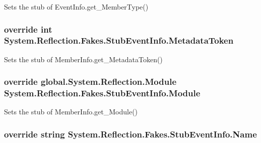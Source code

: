 Sets the stub of Event\-Info.\-get\-\_\-\-Member\-Type()

\hypertarget{class_system_1_1_reflection_1_1_fakes_1_1_stub_event_info_a74ab710ef8a7fcb8a5a868e999e67e84}{
\subsubsection[{Metadata\-Token}]{\setlength{\rightskip}{0pt plus 5cm}override int System.\-Reflection.\-Fakes.\-Stub\-Event\-Info.\-Metadata\-Token\hspace{0.3cm}{\ttfamily [get]}}}\label{class_system_1_1_reflection_1_1_fakes_1_1_stub_event_info_a74ab710ef8a7fcb8a5a868e999e67e84}


Sets the stub of Member\-Info.\-get\-\_\-\-Metadata\-Token()

\hypertarget{class_system_1_1_reflection_1_1_fakes_1_1_stub_event_info_af1184f14eb14994d2397a26e1b40bf4f}{
\subsubsection[{Module}]{\setlength{\rightskip}{0pt plus 5cm}override global.\-System.\-Reflection.\-Module System.\-Reflection.\-Fakes.\-Stub\-Event\-Info.\-Module\hspace{0.3cm}{\ttfamily [get]}}}\label{class_system_1_1_reflection_1_1_fakes_1_1_stub_event_info_af1184f14eb14994d2397a26e1b40bf4f}


Sets the stub of Member\-Info.\-get\-\_\-\-Module()

\hypertarget{class_system_1_1_reflection_1_1_fakes_1_1_stub_event_info_a7bae4db326265e75449c92a270518830}{
\subsubsection[{Name}]{\setlength{\rightskip}{0pt plus 5cm}override string System.\-Reflection.\-Fakes.\-Stub\-Event\-Info.\-Name\hspace{0.3cm}{\ttfamily [get]}}}\label{class_system_1_1_reflection_1_1_fakes_1_1_stub_event_info_a7bae4db326265e75449c92a270518830}


